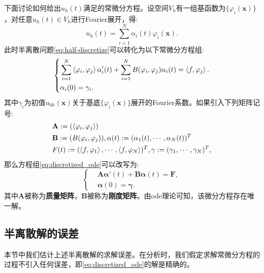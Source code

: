 下面讨论如何给出$u_{h}(t)$满足的常微分方程。设空间$V_{h}$有一组基函数为$\{\varphi_{i}(\mathbf{x})\}$，对任意$u_{h}(t)\in V_{h}$进行Fourier展开，得:
\begin{equation}
    \label{eq:FourierExpension}
    u_{h}(t)=\sum_{i=1}^{N}\alpha_{i}(t)\varphi_{i}(\mathbf{x}).
\end{equation}
此时半离散问题\eqref{eq:half-discretize}可以转化为以下常微分方程组:
\begin{equation}
    \label{eq:discretized_ode}
    \left\{
        \begin{aligned}
            &\sum_{i=1}^{N}\left<\varphi_{i},\varphi_{j}\right>\alpha_{i}'(t)+\sum_{i=1}^{N}B(\varphi_{i},\varphi_{j})\alpha_{i}(t)=\left<f,\varphi_{j}\right>.\\
            &\alpha_{i}(0)=\gamma_{i}.
        \end{aligned}
    \right.
\end{equation}
其中$\gamma_{i}$为初值$u_{0h}(\mathbf{x})$关于基底$\{\varphi_{i}(\mathbf{x})\}$展开的Fourier系数。如果引入下列矩阵记号:
\begin{equation}
    \begin{aligned}
        &\mathbf{A}:=(\left<\varphi_{i},\varphi_{j}\right>)\\
        &\mathbf{B}:=(B(\varphi_{i},\varphi_{j})),\mathbf{\alpha}(t):=(\alpha_{1}(t),\cdots,\alpha_{N}(t))^{T}\\
        &F(t):=(\left<f,\varphi_{1}\right>,\cdots,\left<f,\varphi_{N}\right>)^{T}, \mathbf{\gamma}:=(\gamma_{1},\cdots,\gamma_{N})^{T},
        \end{aligned}
\end{equation}
那么方程组\eqref{eq:discretized_ode}可以改写为:
\begin{equation}
    \left\{
        \begin{aligned}
            &\mathbf{A}\mathbf{\alpha}'(t)+\mathbf{B}\mathbf{\alpha}(t)=\mathbf{F},\\
            &\mathbf{\alpha}(0)=\mathbf{\gamma}.
        \end{aligned}
    \right.
\end{equation}
其中$\mathbf{A}$被称为\textbf{质量矩阵}，$\mathbf{B}$被称为\textbf{刚度矩阵}。由ode理论可知，该微分方程存在唯一解。
\subsection{半离散解的误差}
本节中我们估计上述半离散解的求解误差。在分析时，我们假定求解常微分方程的过程不引入任何误差，即\eqref{eq:discretized_ode}的解是精确的。

